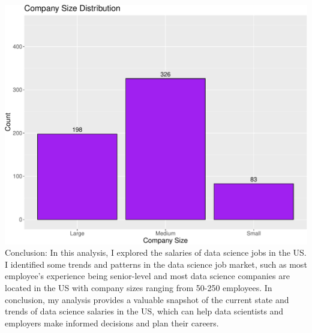 \documentclass[
]{article}
\begin{document}
\includegraphics{Susman_RProject_files/figure-latex/unnamed-chunk-21-1.pdf}
Conclusion: In this analysis, I explored the salaries of data science
jobs in the US. I identified some trends and patterns in the data
science job market, such as most employee's experience being
senior-level and most data science companies are located in the US with
company sizes ranging from 50-250 employees. In conclusion, my analysis
provides a valuable snapshot of the current state and trends of data
science salaries in the US, which can help data scientists and employers
make informed decisions and plan their careers.
\end{document}
